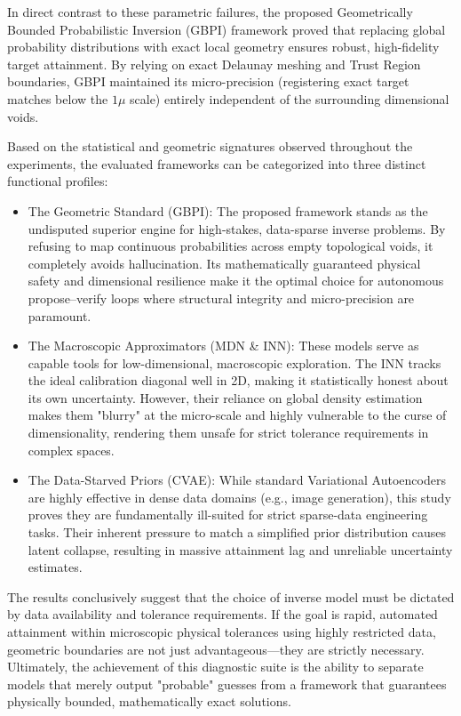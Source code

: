 In direct contrast to these parametric failures, the proposed Geometrically Bounded Probabilistic Inversion (GBPI) framework proved that replacing global probability distributions with exact local geometry ensures robust, high-fidelity target attainment. By relying on exact Delaunay meshing and Trust Region boundaries, GBPI maintained its micro-precision (registering exact target matches below the $1\mu$ scale) entirely independent of the surrounding dimensional voids. 

Based on the statistical and geometric signatures observed throughout the experiments, the evaluated frameworks can be categorized into three distinct functional profiles:

\begin{itemize}
    \item The Geometric Standard (GBPI): The proposed framework stands as the undisputed superior engine for high-stakes, data-sparse inverse problems. By refusing to map continuous probabilities across empty topological voids, it completely avoids hallucination. Its mathematically guaranteed physical safety and dimensional resilience make it the optimal choice for autonomous propose--verify loops where structural integrity and micro-precision are paramount.
    \item The Macroscopic Approximators (MDN \& INN): These models serve as capable tools for low-dimensional, macroscopic exploration. The INN tracks the ideal calibration diagonal well in 2D, making it statistically honest about its own uncertainty. However, their reliance on global density estimation makes them "blurry" at the micro-scale and highly vulnerable to the curse of dimensionality, rendering them unsafe for strict tolerance requirements in complex spaces.
    \item The Data-Starved Priors (CVAE): While standard Variational Autoencoders are highly effective in dense data domains (e.g., image generation), this study proves they are fundamentally ill-suited for strict sparse-data engineering tasks. Their inherent pressure to match a simplified prior distribution causes latent collapse, resulting in massive attainment lag and unreliable uncertainty estimates.
\end{itemize}

The results conclusively suggest that the choice of inverse model must be dictated by data availability and tolerance requirements. If the goal is rapid, automated attainment within microscopic physical tolerances using highly restricted data, geometric boundaries are not just advantageous—they are strictly necessary. Ultimately, the achievement of this diagnostic suite is the ability to separate models that merely output "probable" guesses from a framework that guarantees physically bounded, mathematically exact solutions.


